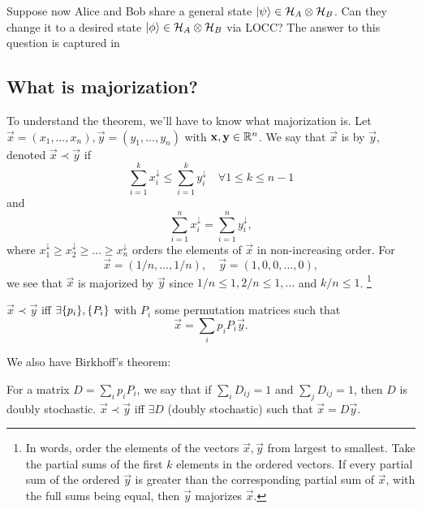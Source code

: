 Suppose now Alice and Bob share a general state $\lvert\psi\rangle\in \mathcal H_A \otimes \mathcal H_B$. Can they change it to a desired state $\lvert\phi\rangle\in \mathcal H_A \otimes \mathcal H_B$ via LOCC? The answer to this question is captured in 

\subsection*{What is majorization?} 
To understand the theorem, we'll have to know what majorization is. Let $\vec x=(x_1,\ldots, x_n), \vec y=(y_1,\ldots,y_n)$ with $\boldsymbol{\mathbf{x}},\boldsymbol{\mathbf{y}}\in \mathbb{R}^n$. We say that $\vec x$ is  by $\vec y$, denoted $\vec x \prec \vec y$ if
\begin{equation}
    \sum_{i=1}^k x_i^{\downarrow} \leq \sum_{i=1}^k y_i^{\downarrow} \quad\forall 1\leq k \leq n-1
\end{equation}
and
\begin{equation}
    \sum_{i=1}^n x_i^{\downarrow} = \sum_{i=1}^n y_i^{\downarrow},
\end{equation}
where $x_1^{\downarrow} \geq x_2^{\downarrow} \geq \ldots \geq x_n^{\downarrow}$ orders the elements of $\vec x$ in non-increasing order. For
\begin{equation}
    \vec x=(1/n,\ldots, 1/n),\quad \vec y=(1,0,0,\ldots,0),
\end{equation}
we see that $\vec x$ is majorized by $\vec y$ since $1/n \leq 1, 2/n \leq 1,\ldots$ and $k/n \leq 1$.%
    \footnote{In words, order the elements of the vectors $\vec x,\vec y$ from largest to smallest. Take the partial sums of the first $k$ elements in the ordered vectors. If every partial sum of the ordered $\vec y$ is greater than the corresponding partial sum of $\vec x$, with the full sums being equal, then $\vec y$ majorizes $\vec x$.}

\begin{thm}
    $\vec x \prec \vec y$ iff $\exists\{p_i\},\{P_i\}$ with $P_i$ some permutation matrices such that
    \begin{equation}
        \vec x = \sum_i p_i P_i \vec y.
    \end{equation}
\end{thm}
We also have Birkhoff's theorem:
\begin{thm}
    For a matrix $D=\sum_i p_i P_i$, we say that if $\sum_i D_{ij}=1$ and $\sum_j D_{ij}=1$, then $D$ is doubly stochastic. $\vec x \prec \vec y$ iff $\exists D$ (doubly stochastic) such that $\vec x = D \vec y.$
\end{thm}

